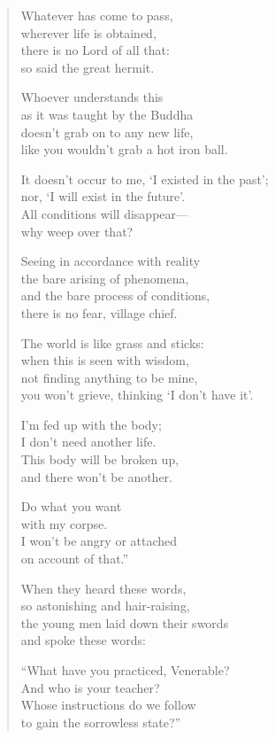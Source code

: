 \documentclass[12pt,openany]{book}%
\begin{document}
\begin{verse}
Whatever has come to pass, \\
wherever life is obtained, \\
there is no Lord of all that: \\
so said the great hermit. 

Whoever understands this \\
as it was taught by the Buddha \\
doesn’t grab on to any new life, \\
like you wouldn’t grab a hot iron ball. 

It doesn’t occur to me, ‘I existed in the past’; \\
nor, ‘I will exist in the future’. \\
All conditions will disappear—\\
why weep over that? 

Seeing in accordance with reality \\
the bare arising of phenomena, \\
and the bare process of conditions, \\
there is no fear, village chief. 

The world is like grass and sticks: \\
when this is seen with wisdom, \\
not finding anything to be mine, \\
you won’t grieve, thinking ‘I don’t have it’. 

I’m fed up with the body; \\
I don’t need another life. \\
This body will be broken up, \\
and there won’t be another. 

Do what you want \\
with my corpse. \\
I won’t be angry or attached \\
on account of that.” 

When they heard these words, \\
so astonishing and hair-raising, \\
the young men laid down their swords \\
and spoke these words: 

“What have you practiced, Venerable? \\
And who is your teacher? \\
Whose instructions do we follow \\
to gain the sorrowless state?” 


\end{verse}
\end{document}
